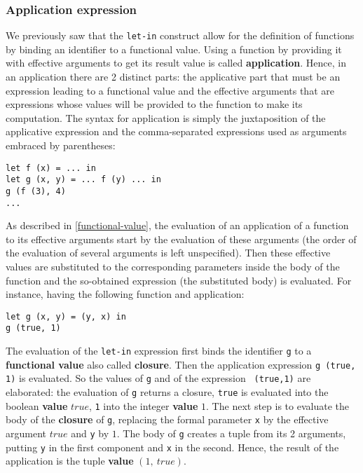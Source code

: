 \subsubsection{Application expression}
\label{function-application}
  We previously
saw that the {\tt let-in} construct allow for the definition of functions by
binding an identifier to a functional value. Using a function by
providing it with effective arguments to get its result value is
called {\bf application}. Hence, in an application there are 2
distinct parts: the applicative part that must be an expression
leading to a functional value and the effective arguments that are
expressions whose values will be provided to the function to make its
computation. The syntax for application is simply the juxtaposition of
the applicative expression and the comma-separated expressions used as
arguments embraced by parentheses: {\scriptsize
\begin{lstlisting}
let f (x) = ... in
let g (x, y) = ... f (y) ... in
g (f (3), 4)
...
\end{lstlisting}
}
As described in \ref{functional-value}, the evaluation of an
application of a function to its effective arguments start by the
evaluation of these arguments (the order of the evaluation of several
arguments is left unspecified). Then these effective values are
substituted to the corresponding parameters inside the body of the
function and the so-obtained expression (the substituted body) is
evaluated.  For instance, having the
following function and application:
{\scriptsize
\begin{lstlisting}
let g (x, y) = (y, x) in
g (true, 1)
\end{lstlisting}
} The evaluation of the {\tt let-in} expression first binds the
identifier {\tt g} to a {\bf functional value} also called {\bf
  closure}. Then the application expression {\tt g (true, 1)} is
evaluated. So the values of {\tt g} and of the expression {\tt
  (true,1)} are elaborated: the evaluation of {\tt g} returns a
closure, {\tt true} is evaluated into the boolean {\bf value} $true$,
{\tt 1} into the integer {\bf value} $1$. The next step is to evaluate
the body of the {\bf closure} of {\tt g}, replacing the formal
parameter {\tt x} by the effective argument $true$ and {\tt y} by
$1$. The body of {\tt g} creates a tuple from its 2 arguments, putting
{\tt y} in the first component and {\tt x} in the second. Hence, the
result of the application is the tuple {\bf value} $(1,\ true)$.



